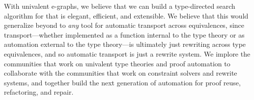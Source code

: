 With univalent e-graphs, we believe that we can build a type-directed search algorithm for 
\toolname that is elegant, efficient, and extensible.
We believe that this would generalize beyond \toolname to \textit{any} tool
for automatic transport across equivalences, since transport---whether implemented as a function internal to the
type theory or as automation external to the type theory---is ultimately just rewriting across type equivalences,
and so automatic transport is just a rewrite system.
We implore the communities that work on univalent type theories and proof automation to collaborate with
the communities that work on constraint solvers and rewrite systems, and together build
the next generation of automation for proof reuse, refactoring, and repair.


